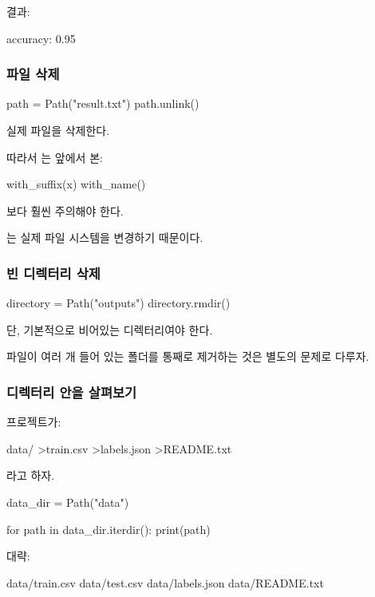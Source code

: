 결과:

\begin{dhkzsh}
accuracy: 0.95
\end{dhkzsh}

\subsubsection{파일 삭제}

\begin{dhkcode}
path = Path("result.txt")
path.unlink()
\end{dhkcode}

실제 파일을 삭제한다.

따라서 는 앞에서 본:

\begin{dhkcode}
with_suffix(x)
with_name()
\end{dhkcode}

보다 훨씬 주의해야 한다.

는 실제 파일 시스템을 변경하기 때문이다.

\subsubsection{빈 디렉터리 삭제}

\begin{dhkcode}
directory = Path("outputs")
directory.rmdir()
\end{dhkcode}

단, 기본적으로 비어있는 디렉터리여야 한다.

파일이 여러 개 들어 있는 폴더를 통째로 제거하는 것은 별도의 문제로 다루자.

\subsubsection{디렉터리 안을 살펴보기}

프로젝트가:

\begin{dhkdir}
data/
>train.csv
>labels.json
>README.txt
\end{dhkdir}

라고 하자.

\begin{dhkcode}
data_dir = Path("data")

for path in data_dir.iterdir():
    print(path)
\end{dhkcode}

대략:

\begin{dhkzsh}
data/train.csv
data/test.csv
data/labels.json
data/README.txt
\end{dhkzsh}

